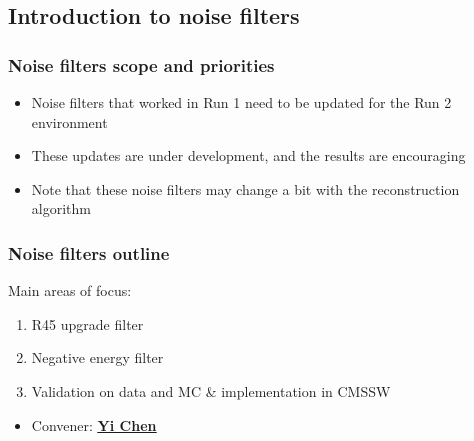 \documentclass[bigger]{beamer}
\providecommand{\alert}[1]{\textbf{#1}}
\begin{document}
\subsection{Introduction to noise filters}
\label{sec-4-1}
\begin{frame}
\frametitle{Noise filters scope and priorities}
\label{sec-4-1-1}
\begin{itemize}

\item Noise filters that worked in Run 1 need to be updated for the Run 2 environment
\label{sec-4-1-1-1}%

\item These updates are under development, and the results are encouraging
\label{sec-4-1-1-2}%

\item Note that these noise filters may change a bit with the reconstruction algorithm
\label{sec-4-1-1-3}%
\end{itemize} %
\end{frame}
\begin{frame}
\frametitle{Noise filters outline}
\label{sec-4-1-2}
\begin{block}{Main areas of focus:}
\label{sec-4-1-2-1}

\begin{enumerate}
\item R45 upgrade filter
\item Negative energy filter
\item Validation on data and MC \& implementation in CMSSW
\end{enumerate}
\end{block}
\begin{itemize}

\item Convener: \href{mailto:yi.chen@cern.ch}{\underline{\alert{Yi Chen}}}
\label{sec-4-1-2-2}%
\end{itemize} %
\end{frame}
\end{document}
